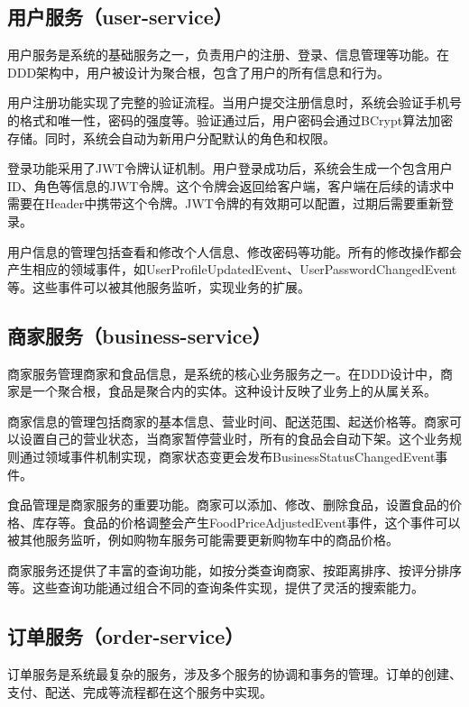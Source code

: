 \documentclass[a4paper,12pt]{article}
\begin{document}
\subsection{用户服务（user-service）}

用户服务是系统的基础服务之一，负责用户的注册、登录、信息管理等功能。在DDD架构中，用户被设计为聚合根，包含了用户的所有信息和行为。

用户注册功能实现了完整的验证流程。当用户提交注册信息时，系统会验证手机号的格式和唯一性，密码的强度等。验证通过后，用户密码会通过BCrypt算法加密存储。同时，系统会自动为新用户分配默认的角色和权限。

登录功能采用了JWT令牌认证机制。用户登录成功后，系统会生成一个包含用户ID、角色等信息的JWT令牌。这个令牌会返回给客户端，客户端在后续的请求中需要在Header中携带这个令牌。JWT令牌的有效期可以配置，过期后需要重新登录。

用户信息的管理包括查看和修改个人信息、修改密码等功能。所有的修改操作都会产生相应的领域事件，如UserProfileUpdatedEvent、UserPasswordChangedEvent等。这些事件可以被其他服务监听，实现业务的扩展。

\subsection{商家服务（business-service）}

商家服务管理商家和食品信息，是系统的核心业务服务之一。在DDD设计中，商家是一个聚合根，食品是聚合内的实体。这种设计反映了业务上的从属关系。

商家信息的管理包括商家的基本信息、营业时间、配送范围、起送价格等。商家可以设置自己的营业状态，当商家暂停营业时，所有的食品会自动下架。这个业务规则通过领域事件机制实现，商家状态变更会发布BusinessStatusChangedEvent事件。

食品管理是商家服务的重要功能。商家可以添加、修改、删除食品，设置食品的价格、库存等。食品的价格调整会产生FoodPriceAdjustedEvent事件，这个事件可以被其他服务监听，例如购物车服务可能需要更新购物车中的商品价格。

商家服务还提供了丰富的查询功能，如按分类查询商家、按距离排序、按评分排序等。这些查询功能通过组合不同的查询条件实现，提供了灵活的搜索能力。

\subsection{订单服务（order-service）}

订单服务是系统最复杂的服务，涉及多个服务的协调和事务的管理。订单的创建、支付、配送、完成等流程都在这个服务中实现。
\end{document}
